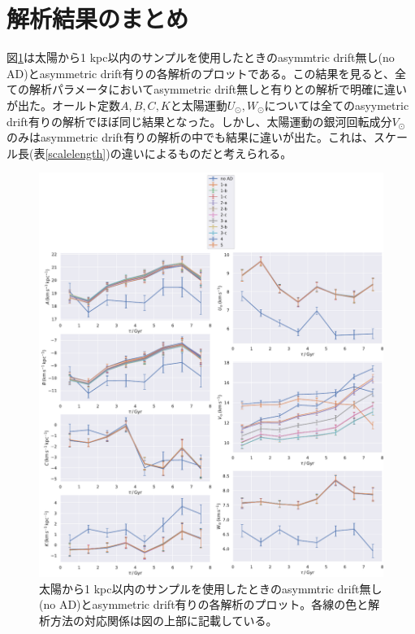 
\section{解析結果のまとめ}
図\ref{multi}は太陽から1 kpc以内のサンプルを使用したときのasymmtric drift無し(no AD)とasymmetric drift有りの各解析のプロットである。この結果を見ると、全ての解析パラメータにおいてasymmetric drift無しと有りとの解析で明確に違いが出た。オールト定数$A,B,C,K$と太陽運動$U_{\odot},W_{\odot}$については全てのasyymetric drift有りの解析でほぼ同じ結果となった。しかし、太陽運動の銀河回転成分$V_{\odot}$のみはasymmetric drift有りの解析の中でも結果に違いが出た。これは、スケール長(表\ref{scalelength})の違いによるものだと考えられる。
\begin{figure}[htbp]
\begin{center}
	\includegraphics[width=15cm]{fig/multi/multi.pdf}
	\caption{太陽から1 kpc以内のサンプルを使用したときのasymmtric drift無し(no AD)とasymmetric drift有りの各解析のプロット。各線の色と解析方法の対応関係は図の上部に記載している。}
	\label{multi}
\end{center}
\end{figure}